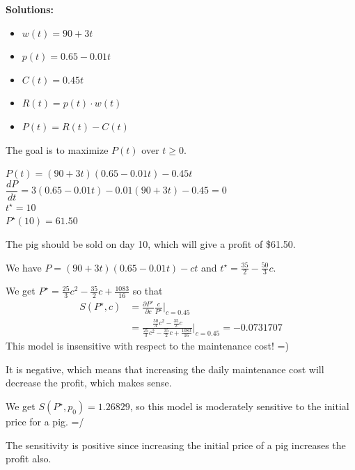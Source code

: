 \documentclass{workbook}
\begin{document}
\begin{solution}
\begin{slide}
\textbf{Solutions:}
\begin{parts}
	\item 
	\begin{itemize}
 		\item $w(t) = 90 + 3t$
 		\item $p(t) = 0.65-0.01t$
 		\item $C(t) = 0.45t$
 		\item $R(t) = p(t) \cdot w(t)$
 		\item $P(t) = R(t) - C(t)$
 	\end{itemize}
 	\item The goal is to maximize $P(t)$ over $t\geq 0$.
 	\item 	$P(t) = (90+3t)(0.65-0.01t) - 0.45t$ \\
			$\dfrac{dP}{dt} = 3(0.65-0.01t)-0.01(90+3t) - 0.45 = 0$\\
 			$t^\star = 10$ \\	
 			$P^\star(10) = 61.50$
 	\item The pig should be sold on day 10, which will give a profit of \$61.50.

	\item We have $P = (90+3t)(0.65-0.01t) - ct$ and $t^\star = \frac{35}{2} - \frac{50}{3} c$.

		We get $P^\star = \frac{25}{3} c^2 - \frac{35}{2} c + \frac{1083}{16}$ so that
		\begin{align*}
		S(P^\star,c) 
			& = \frac{\partial P^\star}{\partial c} \frac{c}{P^\star} \big|_{c=0.45} \\
			& = \frac{\frac{50}{3} c^2 - \frac{35}{2}c}{\frac{25}{3} c^2 - \frac{35}{2} c + \frac{1083}{16}}\big|_{c=0.45}
			= -0.0731707
		\end{align*}
		This model is insensitive with respect to the maintenance cost! =)
	\item It is negative, which means that increasing the daily maintenance cost will decrease the profit, which makes sense.
	
	\item We get $S(P^\star,p_0) = 1.26829$, so
%
%
		this model is moderately sensitive to the initial price for a pig. =/
		
	\item The sensitivity is positive since increasing the initial price of a pig increases the profit also.
	
\end{parts}


	
\end{slide}

\end{solution}
\end{document}
